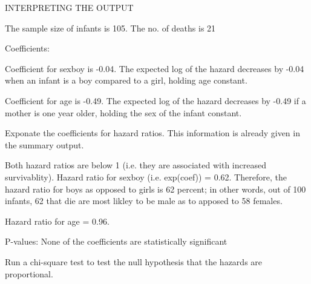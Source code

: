 \documentclass[12pt,letterpaper]{article}
\begin{document}
	\vspace{.25cm}
	
INTERPRETING THE OUTPUT 
	\vspace{.25cm}
	
The sample size of infants is 105. The no. of deaths is 21
	\vspace{.25cm}
	
 Coefficients:

Coefficient for sexboy is -0.04. The expected log of the hazard decreases by -0.04 when an infant is a boy compared to a girl, holding age constant.

Coefficient for age is -0.49. The expected log of the hazard decreases by -0.49 if a mother is one year older, holding the sex of the infant constant.
	\vspace{.25cm}
	
Exponate the coefficients for hazard ratios. This information is already given in the summary output.

Both hazard ratios are below 1 (i.e. they are associated with increased survivablity). Hazard ratio for sexboy (i.e. exp(coef)) = 0.62. Therefore, the hazard ratio for boys as opposed to girls is  62 percent; in other words, out of 100 infants, 62 that die are most likley to be male as to apposed to 58 females. 

Hazard ratio for age = 0.96. 
	\vspace{.25cm}
	
P-values: None of the coefficients are statistically significant

Run a chi-square test to test the null hypothesis that the hazards are proportional. 


\end{document}
